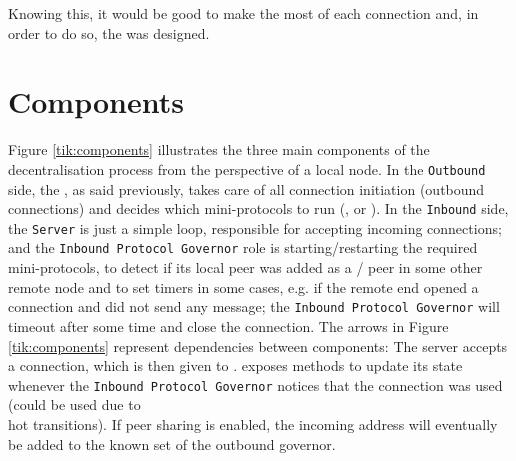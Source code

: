 Knowing this, it would be good to make the most of each connection and, in order to do so, the
\Connmngr{} was designed.

\section{Components}
Figure \ref{tik:components} illustrates the three main components of the decentralisation
process from the perspective of a local node. In the \texttt{Outbound} side, the
\ptopgov{}, as said previously, takes care of all connection initiation (outbound
connections) and decides which mini-protocols to run (\established{}, \warm{} or \hot{}).
In the \texttt{Inbound} side, the \texttt{Server} is just a simple loop, responsible for accepting incoming
connections; and the \texttt{Inbound Protocol Governor} role is starting/restarting the required
mini-protocols, to detect if its local peer was added as a \warm{}/\hot{}
peer in some other remote node and to set timers in some cases, e.g. if the
remote end opened a connection and did not send any message; the
\texttt{Inbound Protocol Governor} will timeout after some time and close the
connection. The arrows in Figure \ref{tik:components} represent dependencies
between components: The server accepts a connection, which is then given to
\Connmngr{}. \Connmngr{} exposes methods to update its state whenever the
\texttt{Inbound Protocol Governor} notices that the connection was used (could
be used due to \warm{}\\hot{} transitions).  If peer sharing is enabled, the
incoming address will eventually be added to the known set of the outbound
governor.

